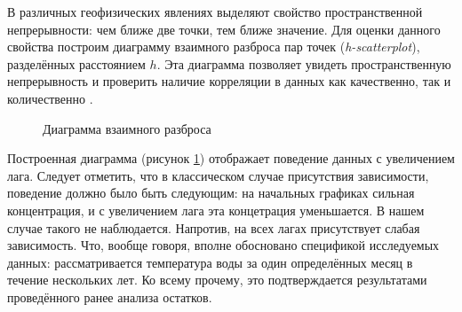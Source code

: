 В различных геофизических явлениях выделяют свойство пространственной непрерывности: чем ближе две точки, тем ближе значение. Для оценки данного свойства построим диаграмму взаимного разброса пар точек (\textit{h-scatterplot}), разделённых расстоянием $ h $. Эта диаграмма позволяет увидеть пространственную непрерывность и проверить наличие корреляции в данных как качественно, так и количественно \cite{saveliev2012}.
\begin{figure}[H]
\caption{Диаграмма взаимного разброса}
\label{img:hscat}
\end{figure}
Построенная диаграмма (рисунок \ref{img:hscat}) отображает поведение данных с увеличением лага. Следует отметить, что в классическом случае присутствия зависимости, поведение должно было быть следующим: на начальных графиках сильная концентрация, и с увеличением лага эта концетрация уменьшается. В нашем случае такого не наблюдается. Напротив, на всех лагах присутствует слабая зависимость. Что, вообще говоря, вполне обосновано спецификой исследуемых данных: рассматривается температура воды за один определённых месяц в течение нескольких лет. Ко всему прочему, это подтверждается результатами проведённого ранее анализа остатков.

